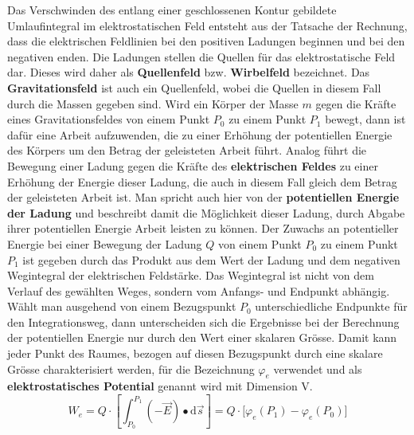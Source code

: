 Das Verschwinden des entlang einer geschlossenen Kontur gebildete Umlaufintegral im elektrostatischen Feld entsteht aus der Tatsache der Rechnung, dass die elektrischen Feldlinien bei den positiven Ladungen beginnen und bei den negativen enden. Die Ladungen stellen die Quellen für das elektrostatische Feld dar. Dieses wird daher als \textbf{Quellenfeld} bzw. \textbf{Wirbelfeld} bezeichnet.
\newline\newline
Das \textbf{Gravitationsfeld} ist auch ein Quellenfeld, wobei die Quellen in diesem Fall durch die Massen gegeben sind. Wird ein Körper der Masse $m$ gegen die Kräfte eines Gravitationsfeldes von einem Punkt $P_0$ zu einem Punkt $P_1$ bewegt, dann ist dafür eine Arbeit aufzuwenden, die zu einer Erhöhung der potentiellen Energie des Körpers um den Betrag der geleisteten Arbeit führt.
\newline\newline
Analog führt die Bewegung einer Ladung gegen die Kräfte des \textbf{elektrischen Feldes} zu einer Erhöhung der Energie dieser Ladung, die auch in diesem Fall gleich dem Betrag der geleisteten Arbeit ist. Man spricht auch hier von der \textbf{potentiellen Energie der Ladung} und beschreibt damit die Möglichkeit dieser Ladung, durch Abgabe ihrer potentiellen Energie Arbeit leisten zu können. 
\newline\newline
Der Zuwachs an potentieller Energie bei einer Bewegung der Ladung $Q$ von einem Punkt $P_0$ zu einem Punkt $P_1$ ist gegeben durch das Produkt aus dem Wert der Ladung und dem negativen Wegintegral der elektrischen Feldstärke. Das Wegintegral ist nicht von dem Verlauf des gewählten Weges, sondern vom Anfangs- und Endpunkt abhängig.
\newline\newline
Wählt man ausgehend von einem Bezugspunkt $P_0$ unterschiedliche Endpunkte für den Integrationsweg, dann unterscheiden sich die Ergebnisse bei der Berechnung der potentiellen Energie nur durch den Wert einer skalaren Grösse. Damit kann jeder Punkt des Raumes, bezogen auf diesen Bezugspunkt durch eine skalare Grösse charakterisiert werden, für die Bezeichnung $\varphi_e$ verwendet und als \textbf{elektrostatisches Potential} genannt wird mit Dimension $\text{V}$.
\begin{equation} 
\boxed{W_e=Q\cdot \left[\displaystyle \int_{P_0}^{P_1}\left(-\overrightarrow{E}\right)\bullet \text{d}\overrightarrow{s}\right]=Q\cdot \Big[\varphi_e\left(P_1\right)-\varphi_e\left(P_0\right)\Big]}
\end{equation} 
